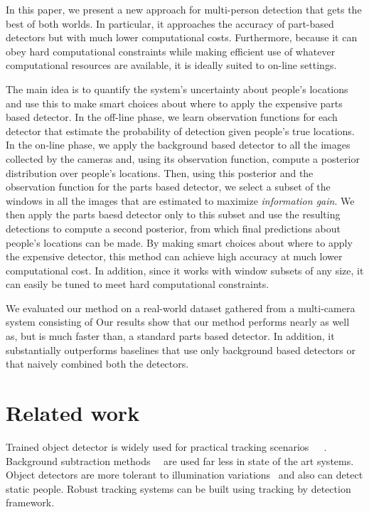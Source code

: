 \documentclass[10pt,twocolumn,letterpaper]{article}
\begin{document}
In this paper, we present a new approach for multi-person detection that gets the best of both worlds.  In particular, it approaches the accuracy of part-based detectors but with much lower computational costs.  Furthermore, because it can obey hard computational constraints while making efficient use of whatever computational resources are available, it is ideally suited to on-line settings.

The main idea is to quantify the system's uncertainty about people's locations and use this to make smart choices about where to apply the expensive parts based detector.  In the off-line phase, we learn observation functions for each detector that estimate the probability of detection given people's true locations.  In the on-line phase, we apply the background based detector to all the images collected by the cameras and, using its observation function, compute a posterior distribution over people's locations.  Then, using this posterior and the observation function for the parts based detector, we select a subset of the windows in all the images that are estimated to maximize \emph{information gain}.  We then apply the parts baesd detector only to this subset and use the resulting detections to compute a second posterior, from which final predictions about people's locations can be made.  By making smart choices about where to apply the expensive detector, this method can achieve high accuracy at much lower computational cost.  In addition, since it works with window subsets of any size, it can easily be tuned to meet hard computational constraints.  

We evaluated our method on a real-world dataset gathered from a multi-camera system consisting of   Our results show that our method performs nearly as well as, but is much faster than, a standard parts based detector.  In addition, it substantially outperforms baselines that use only background based detectors or that naively combined both the detectors.

\section {Related work} 

Trained object detector is widely used for practical tracking scenarios~\cite{Pami-11}~\cite{POM-main}~\cite{MIL-obj1}. Background subtraction methods~\cite{bk1}~\cite{bk2-bayesian} are used far less in state of the art systems. Object detectors are more tolerant to illumination variations~\cite{ObjDet-1} and also can detect static people. Robust tracking systems can be built using  tracking by detection framework.
\end{document}
